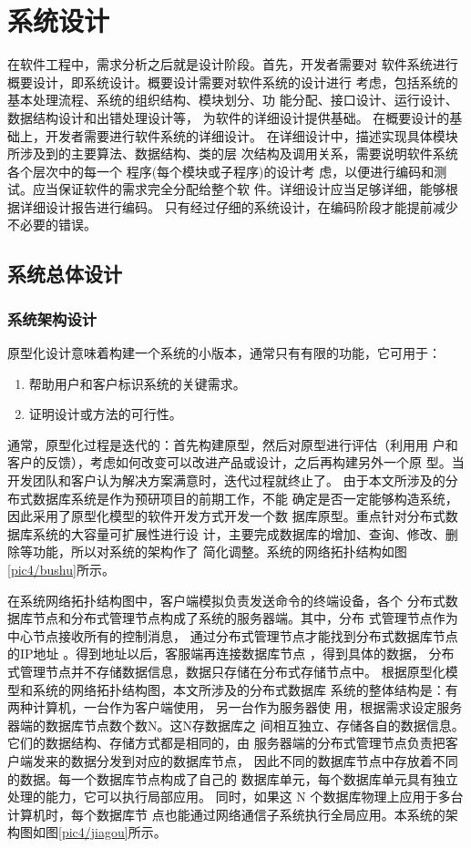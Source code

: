 
\chapter{系统设计}
在软件工程中，需求分析之后就是设计阶段。首先，开发者需要对
软件系统进行概要设计，即系统设计。概要设计需要对软件系统的设计进行
考虑，包括系统的基本处理流程、系统的组织结构、模块划分、功
能分配、接口设计、运行设计、数据结构设计和出错处理设计等，
为软件的详细设计提供基础。
在概要设计的基础上，开发者需要进行软件系统的详细设计。
在详细设计中，描述实现具体模块所涉及到的主要算法、数据结构、类的层
次结构及调用关系，需要说明软件系统各个层次中的每一个
程序(每个模块或子程序)的设计考
虑，以便进行编码和测试。应当保证软件的需求完全分配给整个软
件。详细设计应当足够详细，能够根据详细设计报告进行编码。
只有经过仔细的系统设计，在编码阶段才能提前减少不必要的错误。
\section{系统总体设计}
\subsection{系统架构设计}
原型化设计意味着构建一个系统的小版本，通常只有有限的功能，它可用于：
\begin{enumerate}
	\item 帮助用户和客户标识系统的关键需求。
	\item 证明设计或方法的可行性。
\end{enumerate}
通常，原型化过程是迭代的：首先构建原型，然后对原型进行评估（利用用
户和客户的反馈），考虑如何改变可以改进产品或设计，之后再构建另外一个原
型。当开发团队和客户认为解决方案满意时，迭代过程就终止了。
由于本文所涉及的分布式数据库系统是作为预研项目的前期工作，不能
确定是否一定能够构造系统，因此采用了原型化模型的软件开发方式开发一个数
据库原型。重点针对分布式数据库系统的大容量可扩展性进行设
计，主要完成数据库的增加、查询、修改、删除等功能，所以对系统的架构作了
简化调整。系统的网络拓扑结构如图\ref{pic4/bushu}所示。

在系统网络拓扑结构图中，客户端模拟负责发送命令的终端设备，各个
分布式数据库节点和分布式管理节点构成了系统的服务器端。其中，分布
式管理节点作为中心节点接收所有的控制消息，
通过分布式管理节点才能找到分布式数据库节点的IP地址
。得到地址以后，客服端再连接数据库节点
，得到具体的数据，
分布式管理节点并不存储数据信息，数据只存储在分布式存储节点中。
根据原型化模型和系统的网络拓扑结构图，本文所涉及的分布式数据库
系统的整体结构是：有两种计算机，一台作为客户端使用，
另一台作为服务器使
用，根据需求设定服务器端的数据库节点数个数N。这N存数据库之
间相互独立、存储各自的数据信息。它们的数据结构、存储方式都是相同的，由
服务器端的分布式管理节点负责把客户端发来的数据分发到对应的数据库节点，
因此不同的数据库节点中存放着不同的数据。每一个数据库节点构成了自己的
数据库单元，每个数据库单元具有独立处理的能力，它可以执行局部应用。
同时，如果这 N 个数据库物理上应用于多台计算机时，每个数据库节
点也能通过网络通信子系统执行全局应用。本系统的架构图如图\ref{pic4/jiagou}所示。

